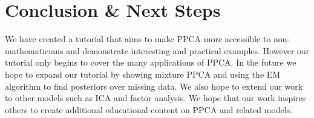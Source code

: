 \section{Conclusion \& Next Steps}
We have created a tutorial that aims to make PPCA more accessible to non-mathematicians and demonstrate interesting and practical examples. However our tutorial only begins to cover the many applications of PPCA. In the future we hope to expand our tutorial by showing mixture PPCA \citep{tipping1999mixtures} and using the EM algorithm to find posteriors over missing data. We also hope to extend our work to other models such as ICA and factor analysis. We hope that our work inspires others to create additional educational content on PPCA and related models.